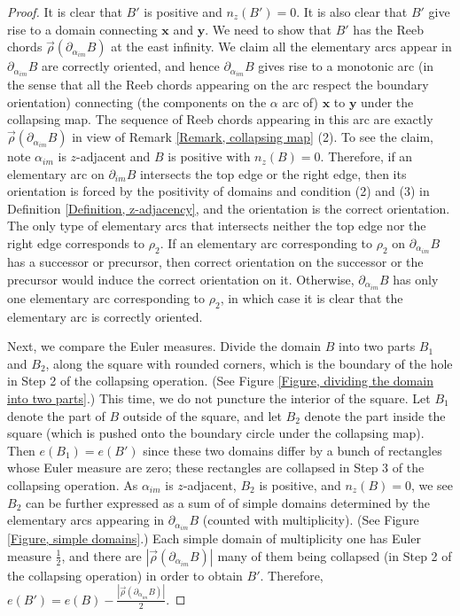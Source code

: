 \documentclass{amsart}
\theoremstyle{definition}
\theoremstyle{remark}
\numberwithin{equation}{section}
\numberwithin{equation}{section} \makeatletter
\begin{document}
\begin{proof}
It is clear that $B'$ is positive and $n_z(B')=0$. It is also clear that $B'$ give rise to a domain connecting $\bm{x}$ and $\bm{y}$. We need to show that $B'$ has the Reeb chords $\overrightarrow{\rho}(\partial_{\alpha_{im}}B)$ at the east infinity. We claim all the elementary arcs appear in $\partial_{\alpha_{im}}B$ are correctly oriented, and hence $\partial_{\alpha_{im}}B$ gives rise to a monotonic arc (in the sense that all the Reeb chords appearing on the arc respect the boundary orientation) connecting (the components on the $\alpha$ arc of) $\bm{x}$ to $\bm{y}$ under the collapsing map. The sequence of Reeb chords appearing in this arc are exactly $\overrightarrow{\rho}(\partial_{\alpha_{im}}B)$ in view of Remark \ref{Remark, collapsing map} (2). To see the claim, note $\alpha_{im}$ is $z$-adjacent and $B$ is positive with $n_z(B)=0$. Therefore, if an elementary arc on $\partial_{im} B$ intersects the top edge or the right edge, then its orientation is forced by the positivity of domains and condition (2) and (3) in Definition \ref{Definition, z-adjacency}, and the orientation is the correct orientation. The only type of elementary arcs that intersects neither the top edge nor the right edge corresponds to $\rho_2$. If an elementary arc corresponding to $\rho_2$ on $\partial_{\alpha_{im}}B$ has a successor or precursor, then correct orientation on the successor or the precursor would induce the correct orientation on it. Otherwise, $\partial_{\alpha_{im}}B$ has only one elementary arc corresponding to $\rho_2$, in which case it is clear that the elementary arc is correctly oriented.      

Next, we compare the Euler measures. Divide the domain $B$ into two parts $B_1$ and $B_2$, along the square with rounded corners, which is the boundary of the hole in Step 2 of the collapsing operation. (See Figure \ref{Figure, dividing the domain into two parts}.) This time, we do not puncture the interior of the square. Let $B_1$ denote the part of $B$ outside of the square, and let $B_2$ denote the part inside the square (which is pushed onto the boundary circle under the collapsing map). Then $e(B_1)=e(B')$ since these two domains differ by a bunch of rectangles whose Euler measure are zero; these rectangles are collapsed in Step 3 of the collapsing operation. As $\alpha_{im}$ is $z$-adjacent, $B_2$ is positive, and $n_z(B)=0$,  we see $B_2$ can be further expressed as a sum of of simple domains determined by the elementary arcs appearing in $\partial_{\alpha_{im}}B$ (counted with multiplicity). (See Figure \ref{Figure, simple domains}.) Each simple domain of multiplicity one has Euler measure $\frac{1}{2}$, and there are $|\overrightarrow{\rho}(\partial_{\alpha_{im}}B)|$ many of them being collapsed (in Step 2 of the collapsing operation) in order to obtain $B'$. Therefore, $e(B')=e(B)-\frac{|\overrightarrow{\rho}(\partial_{\alpha_{im}}B)|}{2}.$ 
\end{proof}
\end{document}
